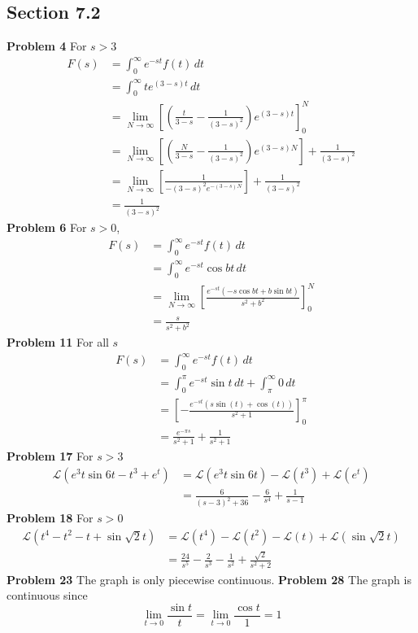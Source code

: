 \subsection*{Section 7.2}
\textbf{Problem 4}
    For $s > 3$
    \begin{align*}
        F(s) 
        &= \int_0^{\infty} e^{-st}f(t) \,dt \\
        &= \int_0^{\infty} te^{(3-s)t} \,dt \\
        &= \lim_{N \to \infty} \left[
            \left(\frac{t}{3-s} - \frac{1}{(3-s)^2}\right)e^{(3-s)t}
        \right]_0^N \\
        &= \lim_{N \to \infty} \left[
            \left(\frac{N}{3-s} - \frac{1}{(3-s)^2}\right)e^{(3-s)N}
        \right]+ \frac{1}{(3-s)^2} \\
        &= \lim_{N \to \infty} \left[
            \frac{1}{-(3-s)^2e^{-(3-s)N}} 
        \right] + \frac{1}{(3-s)^2} \\
        &= \frac{1}{(3-s)^2}
\end{align*}
\textbf{Problem 6}
    For $s > 0$,
    \begin{align*}
        F(s) 
        &= \int_0^{\infty} e^{-st}f(t) \,dt \\
        &= \int_0^{\infty} e^{-st}\cos bt \,dt \\
        &= \lim_{N \to \infty} \left[ 
            \frac{e^{-st}(-s\cos bt + b\sin bt)}{s^2+b^2}
        \right]_0^N \\
        &= \frac{s}{s^2+b^2}
    \end{align*}
\textbf{Problem 11}
    For all $s$
    \begin{align*}
        F(s) 
        &= \int_0^{\infty} e^{-st}f(t) \,dt \\
        &= \int_0^\pi e^{-st}\sin t \,dt 
            + \int_\pi^\infty 0 \,dt \\
        &= \left[
            -\frac{e^{-st}(s\sin(t)+\cos(t))}{s^2+1}
        \right]_0^\pi \\
        &= \frac{e^{-\pi s}}{s^2+1} + \frac{1}{s^2+1}
    \end{align*}
\textbf{Problem 17}
    For $s>3$
    \begin{align*}
        \mathscr{L}(e^3t\sin6t - t^3 + e^t)
        &= \mathscr{L}(e^3t\sin6t) - \mathscr{L}(t^3) + \mathscr{L}(e^t) \\
        &= \frac{6}{(s-3)^2+36}  - \frac{6}{s^4} + \frac{1}{s-1}
    \end{align*}
\textbf{Problem 18}
For $s>0$
\begin{align*}
    \mathscr{L}(t^4-t^2-t + \sin \sqrt{2}t)
    &= \mathscr{L}(t^4) - \mathscr{L}(t^2) - \mathscr{L}(t) + \mathscr{L}(\sin \sqrt{2}t) \\
    &= \frac{24}{s^5}  - \frac{2}{s^3} - \frac{1}{s^2} + \frac{\sqrt{2}}{s^2+2}
\end{align*}
\textbf{Problem 23}
    The graph is only piecewise continuous.
\textbf{Problem 28}
    The graph is continuous since 
    \[
        \lim_{t \to 0} \frac{\sin t}{t}
        = \lim_{t \to 0} \frac{\cos t}{1}
        = 1
    \]